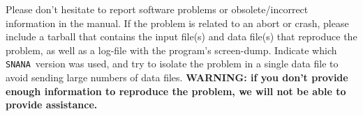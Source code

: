 \documentclass[12pt]{article}
\newcommand{\snana}{{\tt SNANA}}
\begin{document}
Please don't hesitate to report software problems
or obsolete/incorrect information in the manual.
If the problem is related to an abort or crash,
please include a tarball that contains the input file(s)
and data file(s) that reproduce the problem,
as well as a log-file with the program's screen-dump.
Indicate which \snana\ version was used,
and try to isolate the problem in a single data file
to avoid sending large numbers of data files.
{\bf WARNING: if you don't provide enough information to reproduce
the problem, we will not be able to provide assistance.
} %



\clearpage
{}

  

    
\end{document}
